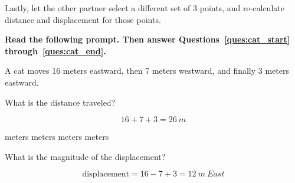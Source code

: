 \documentclass[answers]{exam}
\begin{document}
\begin{questions}
\begin{questions}
Lastly, let the other partner select a different set of 3 points, and re-calculate distance and displacement for those points. 

\clearpage
\begin{EnvUplevel}
\textbf{Read the following prompt. Then answer Questions~\ref{ques:cat_start} through~\ref{ques:cat_end}.} 
\end{EnvUplevel}
\vspace{-0.5em}

\begin{EnvUplevel}
A cat moves 16 meters eastward, then 7 meters westward, and finally 3 meters eastward.
\end{EnvUplevel}

\begin{figure}[h!]
    \centering
\end{figure}

\question \label{ques:cat_start}
What is the distance traveled?

\begin{solution}
\begin{equation*}
    16 + 7 + 3 = \SI{26}{m}
\end{equation*}
\end{solution}

\begin{choices}
 meters
 meters
 meters
 meters
\end{choices}

\question
What is the magnitude of the displacement?

\begin{solution}
\begin{equation*}
  \mathrm{displacement} = 16 - 7 + 3 = \SI{12}{m \ East}  
\end{equation*}


\end{solution}
\end{questions}
\end{questions}
\end{document}
